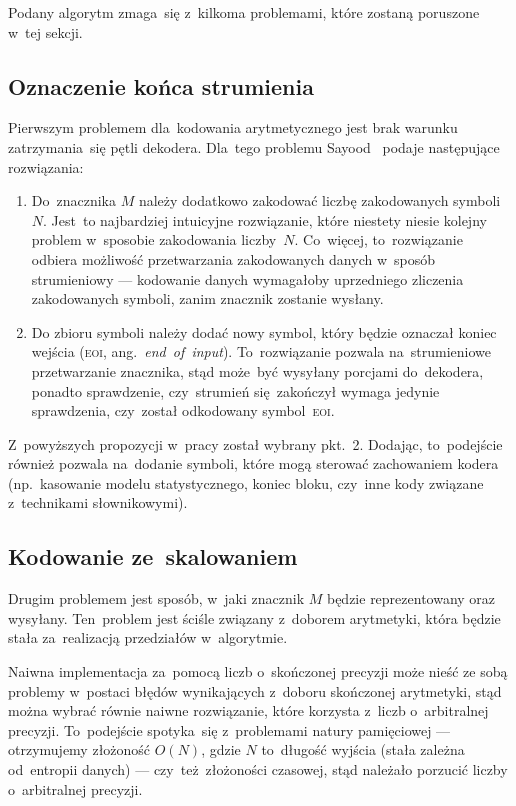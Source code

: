 \documentclass[../../praca.tex]{subfiles}
\begin{document}
Podany algorytm zmaga~się z~kilkoma problemami, które zostaną poruszone w~tej sekcji.

\subsection{Oznaczenie końca strumienia}

Pierwszym problemem dla~kodowania arytmetycznego jest brak warunku
zatrzymania~się pętli dekodera. Dla~tego problemu Sayood~\cite{Sayood:IDC}
podaje następujące rozwiązania:

\begin{enumerate}
  \item Do~znacznika \( M \) należy dodatkowo zakodować liczbę zakodowanych
    symboli \( N \). Jest~to najbardziej intuicyjne rozwiązanie, które niestety niesie
    kolejny problem w~sposobie zakodowania liczby~\( N \). Co~więcej, to~rozwiązanie
    odbiera możliwość przetwarzania zakodowanych danych w~sposób strumieniowy ---
    kodowanie danych wymagałoby uprzedniego zliczenia zakodowanych symboli,
    zanim znacznik zostanie wysłany.
  \item Do zbioru symboli należy dodać nowy symbol, który będzie oznaczał koniec 
    wejścia (\textsc{eoi}, ang.~\emph{end~of~input}). To~rozwiązanie pozwala na~strumieniowe
    przetwarzanie znacznika, stąd może~być wysyłany porcjami do~dekodera, ponadto
    sprawdzenie, czy~strumień się~zakończył wymaga jedynie sprawdzenia, czy~został
    odkodowany symbol~\textsc{eoi}.
\end{enumerate}

Z~powyższych propozycji w~pracy został wybrany pkt.~2. Dodając, to~podejście również
pozwala na~dodanie symboli, które mogą sterować zachowaniem kodera (np.~kasowanie
modelu statystycznego, koniec bloku, czy~inne kody związane z~technikami słownikowymi).

\subsection{Kodowanie ze~skalowaniem}

Drugim problemem jest sposób, w~jaki znacznik \( M \) będzie reprezentowany
oraz wysyłany. Ten~problem jest ściśle związany z~doborem arytmetyki, która będzie
stała za~realizacją przedziałów w~algorytmie.

Naiwna implementacja za~pomocą liczb o~skończonej precyzji może nieść ze sobą
problemy w~postaci błędów wynikających z~doboru skończonej arytmetyki, stąd
można wybrać równie naiwne rozwiązanie, które korzysta z~liczb o~arbitralnej precyzji.
To~podejście spotyka~się z~problemami natury pamięciowej --- otrzymujemy złożoność
\( O (N) \), gdzie \( N \) to~długość wyjścia (stała zależna od~entropii danych) ---
czy~też~złożoności czasowej, stąd należało porzucić liczby o~arbitralnej precyzji.
\end{document}
